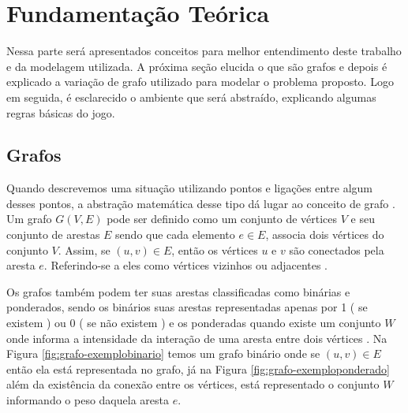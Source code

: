 \chapter{Fundamentação Teórica}
\label{chap:fundteorica}
Nessa parte será apresentados conceitos para melhor entendimento deste trabalho e da modelagem utilizada. 
A próxima seção elucida o que são grafos e depois é explicado a variação de grafo utilizado para modelar o problema proposto. Logo em seguida, é esclarecido o ambiente que será abstraído, explicando algumas regras básicas do jogo.
\section{Grafos}
\label{chap:grafos}

Quando descrevemos uma situação utilizando pontos e ligações entre algum desses pontos, a abstração matemática desse tipo dá lugar ao conceito de grafo \cite{Lucchesi1979}.
Um grafo \(G(V, E)\) pode ser definido como um conjunto de vértices \(V\) e seu conjunto de arestas \(E\) sendo que cada elemento \(e \in E\), associa dois vértices do conjunto \(V\). Assim, se \((u,v) \in E\), então os vértices \(u\) e \(v\) são conectados pela aresta \(e\). Referindo-se a eles como vértices vizinhos ou adjacentes \cite{grafosucinto, Viana2007}.

Os grafos também podem ter suas arestas classificadas como binárias e ponderados, sendo os binários suas arestas representadas apenas por 1 ( se existem ) ou 0 ( se não existem ) e os ponderadas quando existe um conjunto \(W\) onde informa a intensidade da interação de uma aresta entre dois vértices  \cite{Viana2007, cormen6}.
Na Figura \ref{fig:grafo-exemplobinario} temos um grafo binário onde se \((u,v) \in E\) então ela está representada no grafo, já na Figura \ref{fig:grafo-exemploponderado} além da existência da conexão entre os vértices, está representado o conjunto \(W\) informando o peso daquela aresta \(e\).

